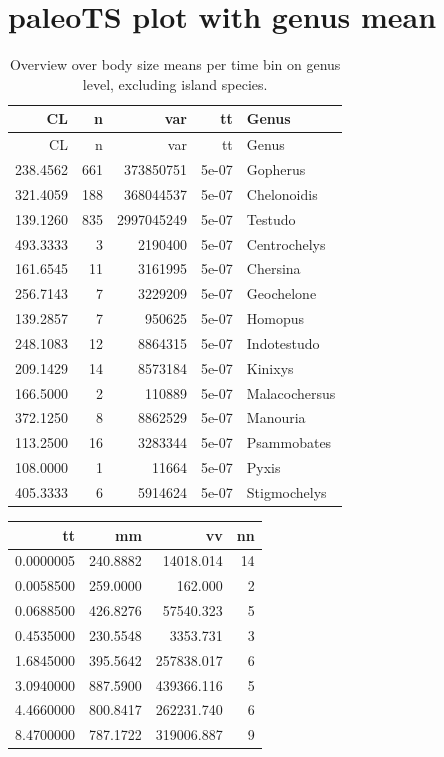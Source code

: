 \documentclass[]{article}
\begin{document}
\newpage

\section{paleoTS plot with genus
mean}\label{paleots-plot-with-genus-mean-1}

\begin{longtable}[]{@{}rrrrl@{}}
\caption{Overview over body size means per time bin on genus level,
excluding island species.}\tabularnewline
\toprule
CL & n & var & tt & Genus\tabularnewline
\midrule
\endfirsthead
\toprule
CL & n & var & tt & Genus\tabularnewline
\midrule
\endhead
238.4562 & 661 & 373850751 & 5e-07 & Gopherus\tabularnewline
321.4059 & 188 & 368044537 & 5e-07 & Chelonoidis\tabularnewline
139.1260 & 835 & 2997045249 & 5e-07 & Testudo\tabularnewline
493.3333 & 3 & 2190400 & 5e-07 & Centrochelys\tabularnewline
161.6545 & 11 & 3161995 & 5e-07 & Chersina\tabularnewline
256.7143 & 7 & 3229209 & 5e-07 & Geochelone\tabularnewline
139.2857 & 7 & 950625 & 5e-07 & Homopus\tabularnewline
248.1083 & 12 & 8864315 & 5e-07 & Indotestudo\tabularnewline
209.1429 & 14 & 8573184 & 5e-07 & Kinixys\tabularnewline
166.5000 & 2 & 110889 & 5e-07 & Malacochersus\tabularnewline
372.1250 & 8 & 8862529 & 5e-07 & Manouria\tabularnewline
113.2500 & 16 & 3283344 & 5e-07 & Psammobates\tabularnewline
108.0000 & 1 & 11664 & 5e-07 & Pyxis\tabularnewline
405.3333 & 6 & 5914624 & 5e-07 & Stigmochelys\tabularnewline
\bottomrule
\end{longtable}

\begin{longtable}[]{@{}rrrr@{}}
\toprule
tt & mm & vv & nn\tabularnewline
\midrule
\endhead
0.0000005 & 240.8882 & 14018.014 & 14\tabularnewline
0.0058500 & 259.0000 & 162.000 & 2\tabularnewline
0.0688500 & 426.8276 & 57540.323 & 5\tabularnewline
0.4535000 & 230.5548 & 3353.731 & 3\tabularnewline
1.6845000 & 395.5642 & 257838.017 & 6\tabularnewline
3.0940000 & 887.5900 & 439366.116 & 5\tabularnewline
4.4660000 & 800.8417 & 262231.740 & 6\tabularnewline
8.4700000 & 787.1722 & 319006.887 & 9\tabularnewline
\bottomrule
\end{longtable}
\end{document}
